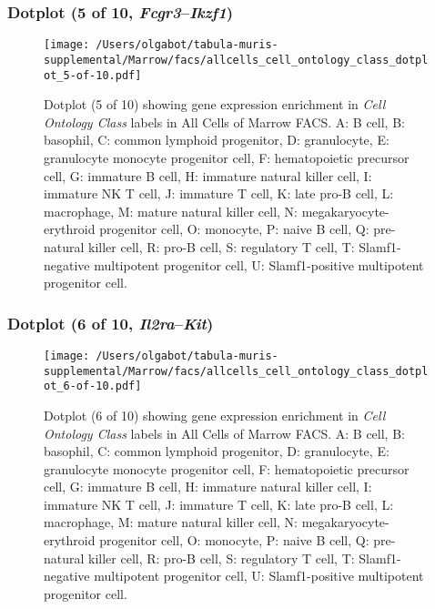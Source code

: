 \subsubsection{Dotplot (5 of 10, \emph{Fcgr3}--\emph{Ikzf1})}
\begin{figure}[h]
\centering
\texttt{[image: /Users/olgabot/tabula-muris-supplemental/Marrow/facs/allcells\_cell\_ontology\_class\_dotplot\_5-of-10.pdf]}

\caption{ Dotplot (5 of 10)  showing gene expression enrichment in \emph{Cell Ontology Class} labels in All Cells of Marrow FACS. A: B cell, B: basophil, C: common lymphoid progenitor, D: granulocyte, E: granulocyte monocyte progenitor cell, F: hematopoietic precursor cell, G: immature B cell, H: immature natural killer cell, I: immature NK T cell, J: immature T cell, K: late pro-B cell, L: macrophage, M: mature natural killer cell, N: megakaryocyte-erythroid progenitor cell, O: monocyte, P: naive B cell, Q: pre-natural killer cell, R: pro-B cell, S: regulatory T cell, T: Slamf1-negative multipotent progenitor cell, U: Slamf1-positive multipotent progenitor cell.}
\end{figure}


\clearpage

\subsubsection{Dotplot (6 of 10, \emph{Il2ra}--\emph{Kit})}
\begin{figure}[h]
\centering
\texttt{[image: /Users/olgabot/tabula-muris-supplemental/Marrow/facs/allcells\_cell\_ontology\_class\_dotplot\_6-of-10.pdf]}

\caption{ Dotplot (6 of 10)  showing gene expression enrichment in \emph{Cell Ontology Class} labels in All Cells of Marrow FACS. A: B cell, B: basophil, C: common lymphoid progenitor, D: granulocyte, E: granulocyte monocyte progenitor cell, F: hematopoietic precursor cell, G: immature B cell, H: immature natural killer cell, I: immature NK T cell, J: immature T cell, K: late pro-B cell, L: macrophage, M: mature natural killer cell, N: megakaryocyte-erythroid progenitor cell, O: monocyte, P: naive B cell, Q: pre-natural killer cell, R: pro-B cell, S: regulatory T cell, T: Slamf1-negative multipotent progenitor cell, U: Slamf1-positive multipotent progenitor cell.}
\end{figure}


\clearpage


